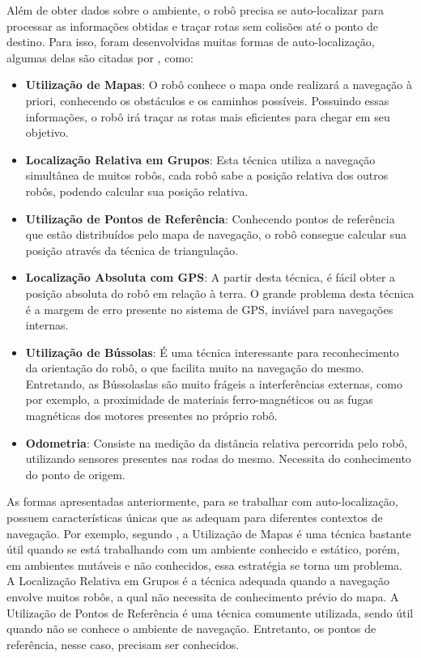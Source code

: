 	Além de obter dados sobre o ambiente, o robô precisa se auto-localizar para processar as informações obtidas e traçar rotas sem colisões até o ponto de destino. Para isso, foram desenvolvidas muitas formas de auto-localização, algumas delas são citadas por \cite{roboBulldozerIV}, como:

	\begin{itemize}
		\item \textbf{Utilização de Mapas}: O robô conhece o mapa onde realizará a navegação à priori, conhecendo os obstáculos e os caminhos possíveis. Possuindo essas informações, o robô irá traçar as rotas mais eficientes para chegar em seu objetivo.

		\item \textbf{Localização Relativa em Grupos}: Esta técnica utiliza a navegação simultânea de muitos robôs, cada robô sabe a posição relativa dos outros robôs, podendo calcular sua posição relativa.

		\item \textbf{Utilização de Pontos de Referência}: Conhecendo pontos de referência que estão distribuídos pelo mapa de navegação, o robô consegue calcular sua posição através da técnica de triangulação.

		\item \textbf{Localização Absoluta com GPS}: A partir desta técnica, é fácil obter a posição absoluta do robô em relação à terra. O grande problema desta técnica é a margem de erro presente no sistema de GPS, inviável para navegações internas.

		\item \textbf{Utilização de Bússolas}: É uma técnica interessante para reconhecimento da orientação do robô, o que facilita muito na navegação do mesmo. Entretando, as Bússolaslas são muito frágeis a interferências externas, como por exemplo, a proximidade de materiais ferro-magnéticos ou as fugas magnéticas dos motores presentes no próprio robô.

		\item \textbf{Odometria}: Consiste na medição da distância relativa percorrida pelo robô, utilizando sensores presentes nas rodas do mesmo. Necessita do conhecimento do ponto de origem.
		 
	\end{itemize}

	As formas apresentadas anteriormente, para se trabalhar com auto-localização, possuem características únicas que as adequam para diferentes contextos de navegação. Por exemplo, segundo \cite{roboBulldozerIV}, a Utilização de Mapas é uma técnica bastante útil quando se está trabalhando com um ambiente conhecido e estático, porém, em ambientes mutáveis e não conhecidos, essa estratégia se torna um problema. A Localização Relativa em Grupos é a técnica adequada quando a navegação envolve muitos robôs, a qual não necessita de conhecimento prévio do mapa. A Utilização de Pontos de Referência é uma técnica comumente utilizada, sendo útil quando não se conhece o ambiente de navegação. Entretanto, os pontos de referência, nesse caso, precisam ser conhecidos. 

